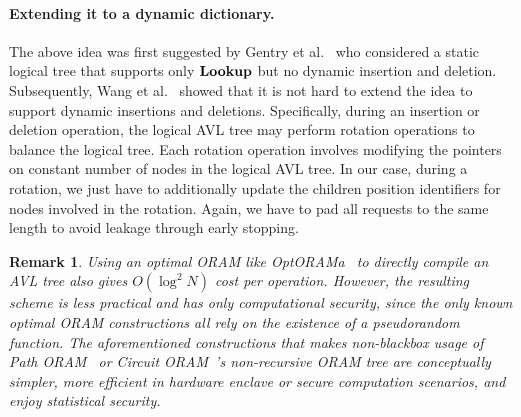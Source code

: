 \documentclass[11pt]{article}
\newtheorem{remark}{Remark}
\begin{document}
\paragraph{Extending it to a dynamic dictionary.}
The above idea was first suggested by Gentry et al.~\cite{gentryods}
who considered a static logical tree that supports
only ${\bf Lookup}$ but no dynamic insertion and deletion.  
Subsequently, Wang et al.~\cite{wang2014oblivious}
showed that it is not hard to extend the idea to support dynamic 
insertions and deletions.
Specifically, during an insertion or deletion operation, 
the logical AVL tree may perform rotation operations
to balance the logical tree.
Each rotation operation involves modifying the pointers
on constant number of nodes 
in the logical AVL tree. 
In our case, during a rotation, 
we just have to additionally
update the children position identifiers
for nodes involved in the rotation. 
Again, we have to pad all 
requests to the same length 
to avoid leakage through early stopping. 






\begin{remark}
Using an optimal ORAM like OptORAMa~\cite{optorama} 
to directly compile an AVL tree also gives $O(\log^2 N)$
cost per operation. 
However, the resulting scheme is less practical and has only computational
security, since the only known optimal ORAM constructions
all rely on the existence of a pseudorandom function.
The aforementioned constructions that makes non-blackbox usage of  
Path ORAM~\cite{stefanov2018path}
or Circuit ORAM~\cite{circuitoram}'s non-recursive ORAM tree 
are conceptually simpler, more efficient in hardware enclave
or secure computation scenarios, and 
enjoy statistical security.
\end{remark}
\end{document}
